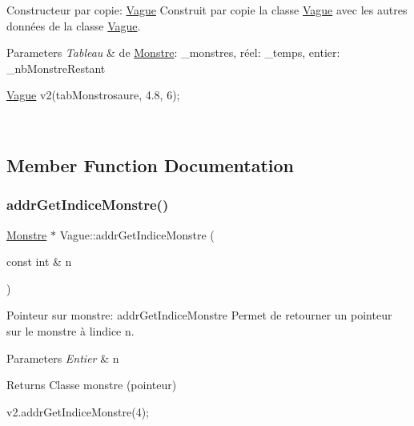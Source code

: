 Constructeur par copie\+: \hyperlink{classVague}{Vague} Construit par copie la classe \hyperlink{classVague}{Vague} avec les autres données de la classe \hyperlink{classVague}{Vague}. 


\begin{DoxyParams}{Parameters}
{\em Tableau} & de \hyperlink{classMonstre}{Monstre}\+: \+\_\+monstres, réel\+: \+\_\+temps, entier\+: \+\_\+nb\+Monstre\+Restant 
\begin{DoxyCode}
\hyperlink{classVague}{Vague} v2(tabMonstrosaure, 4.8, 6);
\end{DoxyCode}
 \\
\hline
\end{DoxyParams}


\subsection{Member Function Documentation}
\mbox{\label{classVague_ab177d208c78c64cb636e3746431a4d16}} 
\subsubsection{\texorpdfstring{addr\+Get\+Indice\+Monstre()}{addrGetIndiceMonstre()}}
{\footnotesize\ttfamily \hyperlink{classMonstre}{Monstre} $\ast$ Vague\+::addr\+Get\+Indice\+Monstre (\begin{DoxyParamCaption}\item[{const int \&}]{n }\end{DoxyParamCaption})}



Pointeur sur monstre\+: addr\+Get\+Indice\+Monstre Permet de retourner un pointeur sur le monstre à l\textquotesingle{}indice n. 


\begin{DoxyParams}{Parameters}
{\em Entier} & n \\
\hline
\end{DoxyParams}
\begin{DoxyReturn}{Returns}
Classe monstre (pointeur) 
\begin{DoxyCode}
v2.addrGetIndiceMonstre(4);
\end{DoxyCode}
 
\end{DoxyReturn}
\mbox{\label{classVague_ae4f544e35c46d10f4545cd768c9af386}} 
